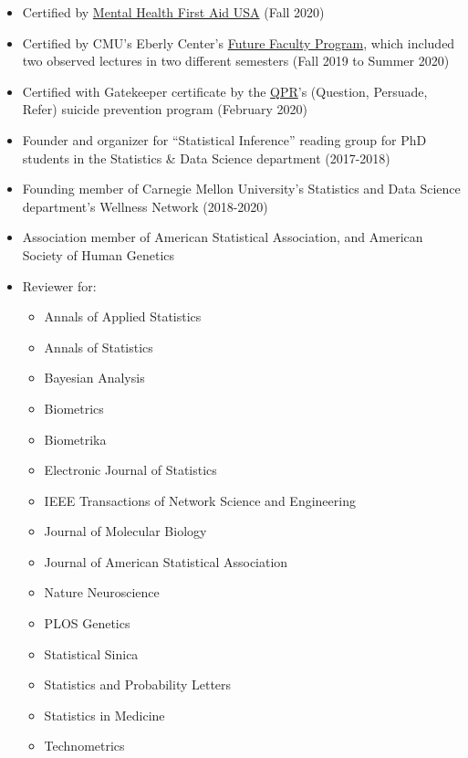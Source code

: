 \documentclass[letterpaper,11pt]{article}
\begin{document}
 
 \begin{itemize}
\item Certified by \href{https://www.cmu.edu/health-services/health-education-and-resources/index.html#:~:text=MHFA}{Mental Health First Aid USA} (Fall 2020)
\item Certified by CMU's Eberly Center's \href{https://www.cmu.edu/teaching/graduatestudentsupport/futurefacultyprogram.html}{Future Faculty Program}, which included two observed lectures in two different semesters (Fall 2019 to Summer 2020)
\item Certified with Gatekeeper certificate by the \href{https://qprinstitute.com/}{QPR}'s (Question, Persuade, Refer) suicide prevention program (February 2020)
\item Founder and organizer for ``Statistical Inference'' reading group for PhD students in the Statistics \& Data Science department (2017-2018)
\item Founding member of Carnegie Mellon University's Statistics and Data Science department's Wellness Network (2018-2020)
\item Association member of American Statistical Association, and American Society of Human Genetics
\item Reviewer for:
\begin{itemize}
\item Annals of Applied Statistics
\item Annals of Statistics
\item Bayesian Analysis
\item Biometrics
\item Biometrika
\item Electronic Journal of Statistics
\item IEEE Transactions of Network Science and Engineering
\item Journal of Molecular Biology
\item Journal of American Statistical Association
\item Nature Neuroscience
\item PLOS Genetics
\item Statistical Sinica
\item Statistics and Probability Letters
\item Statistics in Medicine
\item Technometrics
\end{itemize}
\end{itemize}

\end{document}
